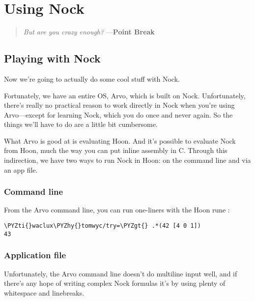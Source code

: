 \chapter{Using Nock}

\begin{quote}
\noindent \emph{But are you crazy enough?}
\medskip \newline
---\textbf{Point Break}
\end{quote}

\section{Playing with Nock}

Now we're going to actually do some cool stuff with Nock.

Fortunately, we have an entire OS, Arvo, which is built on Nock.
Unfortunately, there's really no practical reason to work
directly in Nock when you're using Arvo---except for learning
Nock, which you do once and never again.  So the things we'll
have to do are a little bit cumbersome.

What Arvo is good at is evaluating Hoon.  And it's possible to
evaluate Nock from Hoon, much the way you can put inline assembly
in C.  Through this indirection, we have two ways to run Nock in
Hoon: on the command line and via an app file.

\subsection{Command line}

From the Arvo command line, you can run one-liners with the Hoon
rune :

\begin{framed_shaded}
\begin{Verbatim}[fontsize=\relsize{-2.5},fontseries=b,commandchars=\\\{\}]
\PYZti{}waclux\PYZhy{}tomwyc/try=\PYZgt{} .*(42 [4 0 1])
43
\end{Verbatim}
\end{framed_shaded}

\subsection{Application file}

Unfortunately, the Arvo command line doesn't do multiline input
well, and if there's any hope of writing complex Nock formulas
it's by using plenty of whitespace and linebreaks.

